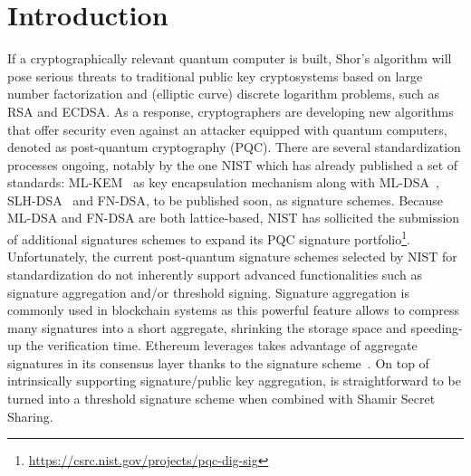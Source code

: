 \section{Introduction}
If a cryptographically relevant quantum computer is built, Shor’s algorithm will pose serious threats to traditional public key cryptosystems based on large number factorization and (elliptic curve) discrete logarithm problems, such as \textsf{RSA} and \textsf{ECDSA}.
As a response, cryptographers are developing new algorithms that offer security even against an attacker equipped with quantum computers, denoted as post-quantum cryptography (PQC).
There are several standardization processes ongoing, notably by the one NIST which has already published a set of standards: ML-KEM~\cite{fips203} as key encapsulation mechanism along with \textsf{ML-DSA}~\cite{fips204}, \textsf{SLH-DSA}~\cite{fips205} and \textsf{FN-DSA}, to be published soon, as signature schemes.
Because \textsf{ML-DSA} and \textsf{FN-DSA} are both lattice-based, NIST has sollicited the submission of additional signatures schemes to expand its PQC signature portfolio\footnote{\url{https://csrc.nist.gov/projects/pqc-dig-sig}}.
Unfortunately, the current post-quantum signature schemes selected by NIST for standardization do not inherently support advanced functionalities such as signature aggregation and/or threshold signing.
Signature aggregation is commonly used in blockchain systems as this powerful feature allows to compress many signatures into a short aggregate, shrinking the storage space and speeding-up the verification time.
Ethereum leverages takes advantage of aggregate signatures in its consensus layer thanks to the \BLS signature scheme~\cite{bls2001}.
On top of intrinsically supporting signature/public key aggregation, \BLS is straightforward to be turned into a threshold signature scheme when combined with Shamir Secret Sharing.
